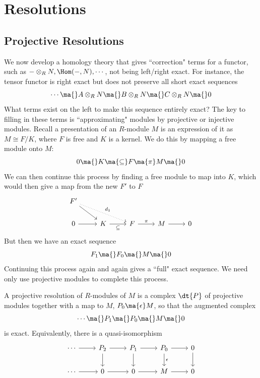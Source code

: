 
\newpage
\section{Resolutions}

\subsection{Projective Resolutions}

We now develop a homology theory that gives ``correction" terms for a functor, such as $- \otimes_R N, \Hom(-,N),\cdots$, not being left/right exact. For instance, the tensor functor is right exact but does not preserve all short exact sequences
\[
\cdots \ma{} A \otimes_R N \ma{} B \otimes_R N \ma{} C \otimes_R N \ma{} 0
\]
What terms exist on the left to make this sequence entirely exact? The key to filling in these terms is ``approximating" modules by projective or injective modules. Recall a presentation of an $R$-module $M$ is an expression of it as $M \cong F/K$, where $F$ is free and $K$ is a kernel. We do this by mapping a free module onto $M$:
\[
0 \ma{} K \ma{\subseteq} F \ma{\pi} M \ma{} 0
\]
We can then continue this process by finding a free module to map into $K$, which would then give a map from the new $F'$ to $F$
\[
\begin{tikzcd}
F' \arrow{dr} \arrow[dotted]{drr}{d_1} & & & & \\
0 \arrow{r} & K \arrow[swap]{r}{\subseteq} & F \arrow{r}{\pi} & M \arrow{r} & 0 
\end{tikzcd}
\] 
But then we have an exact sequence
\[
F_1 \ma{} F_0 \ma{} M \ma{} 0 
\]
Continuing this process again and again gives a ``full" exact sequence. We need only use projective modules to complete this process. 

\begin{dfn}
A projective resolution of $R$-modules of $M$ is a complex $\dt{P}$ of projective modules together with a map to $M$, $P_0 \ma{\epsilon} M$, so that the augmented complex
\[
\cdots \ma{} P_1 \ma{} P_0 \ma{} M \ma{} 0 
\]
is exact. Equivalently, there is a quasi-isomorphism
\[
\begin{tikzcd}
\cdots \arrow{r} & P_2 \arrow{r} \arrow{d} & P_1 \arrow{r} \arrow{d} & P_0 \arrow{r} \arrow{d}{\epsilon} & 0 \arrow{d} \\
\cdots \arrow{r} & 0 \arrow{r} & 0 \arrow{r} & M \arrow{r} & 0 
\end{tikzcd}
\]
\end{dfn}

